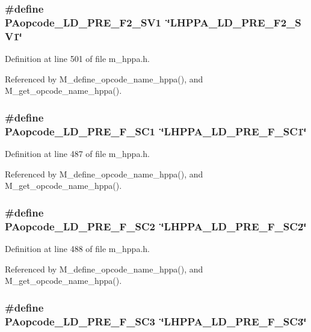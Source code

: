 \subsubsection{\setlength{\rightskip}{0pt plus 5cm}\#define PAopcode\_\-LD\_\-PRE\_\-F2\_\-SV1~\char`\"{}LHPPA\_\-LD\_\-PRE\_\-F2\_\-SV1\char`\"{}}\label{m__hppa_8h_8907feb9354366f500c1568d0fb6c899}




Definition at line 501 of file m\_\-hppa.h.

Referenced by M\_\-define\_\-opcode\_\-name\_\-hppa(), and M\_\-get\_\-opcode\_\-name\_\-hppa().
\subsubsection{\setlength{\rightskip}{0pt plus 5cm}\#define PAopcode\_\-LD\_\-PRE\_\-F\_\-SC1~\char`\"{}LHPPA\_\-LD\_\-PRE\_\-F\_\-SC1\char`\"{}}\label{m__hppa_8h_e75b166cd31ea2ed8d7292caed4512b7}




Definition at line 487 of file m\_\-hppa.h.

Referenced by M\_\-define\_\-opcode\_\-name\_\-hppa(), and M\_\-get\_\-opcode\_\-name\_\-hppa().
\subsubsection{\setlength{\rightskip}{0pt plus 5cm}\#define PAopcode\_\-LD\_\-PRE\_\-F\_\-SC2~\char`\"{}LHPPA\_\-LD\_\-PRE\_\-F\_\-SC2\char`\"{}}\label{m__hppa_8h_45f6deef5343d0bbf1f100a197d8d65b}




Definition at line 488 of file m\_\-hppa.h.

Referenced by M\_\-define\_\-opcode\_\-name\_\-hppa(), and M\_\-get\_\-opcode\_\-name\_\-hppa().
\subsubsection{\setlength{\rightskip}{0pt plus 5cm}\#define PAopcode\_\-LD\_\-PRE\_\-F\_\-SC3~\char`\"{}LHPPA\_\-LD\_\-PRE\_\-F\_\-SC3\char`\"{}}\label{m__hppa_8h_88f7e5b991759bfc4775f6e41aca50fa}




